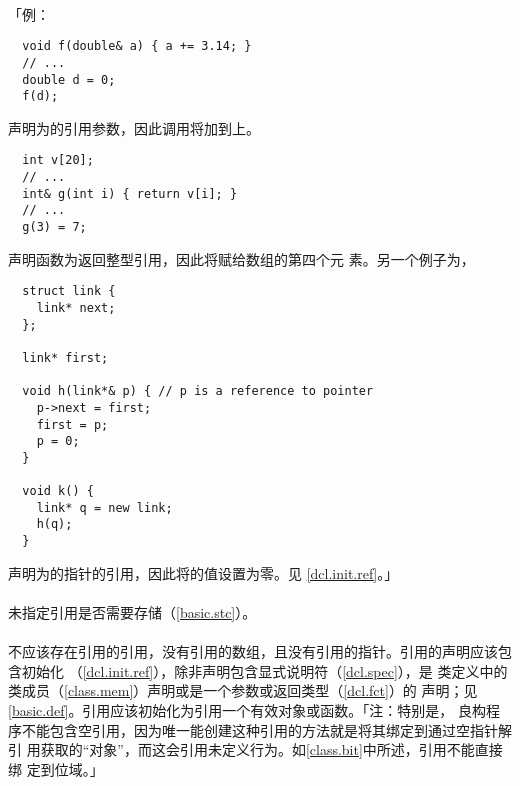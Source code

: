 \paragraph{}
「例：
\begin{lstlisting}
  void f(double& a) { a += 3.14; }
  // ...
  double d = 0;
  f(d);
\end{lstlisting}
声明为的引用参数，因此调用将加到上。
\begin{lstlisting}
  int v[20];
  // ...
  int& g(int i) { return v[i]; }
  // ...
  g(3) = 7;
\end{lstlisting}
声明函数为返回整型引用，因此将赋给数组的第四个元
素。另一个例子为，
\begin{lstlisting}
  struct link {
    link* next;
  };

  link* first;

  void h(link*& p) { // p is a reference to pointer
    p->next = first;
    first = p;
    p = 0;
  }

  void k() {
    link* q = new link;
    h(q);
  }
\end{lstlisting}
声明为的指针的引用，因此将的值设置为零。见
\ref{dcl.init.ref}。」

\paragraph{}
未指定引用是否需要存储（\ref{basic.stc}）。

\paragraph{}
不应该存在引用的引用，没有引用的数组，且没有引用的指针。引用的声明应该包含初始化
（\ref{dcl.init.ref}），除非声明包含显式说明符（\ref{dcl.spec}），是
类定义中的类成员（\ref{class.mem}）声明或是一个参数或返回类型（\ref{dcl.fct}）的
声明；见\ref{basic.def}。引用应该初始化为引用一个有效对象或函数。「注：特别是，
良构程序不能包含空引用，因为唯一能创建这种引用的方法就是将其绑定到通过空指针解引
用获取的``对象''，而这会引用未定义行为。如\ref{class.bit}中所述，引用不能直接绑
定到位域。」

